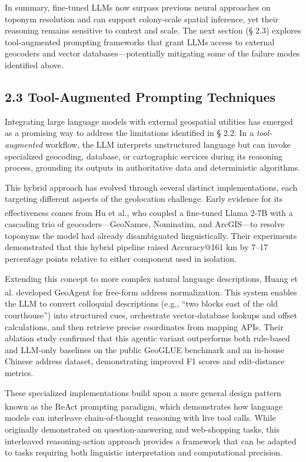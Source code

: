\documentclass[
  10pt,
  twocolumn]{article}
\begin{document}
In summary, fine-tuned LLMs now surpass previous neural approaches on
toponym resolution and can support colony-scale spatial inference, yet
their reasoning remains sensitive to context and scale. The next section
(§ 2.3) explores tool-augmented prompting frameworks that grant LLMs
access to external geocoders and vector databases---potentially
mitigating some of the failure modes identified above.

\subsection{2.3 Tool-Augmented Prompting
Techniques}\label{tool-augmented-prompting-techniques}

Integrating large language models with external geospatial utilities has
emerged as a promising way to address the limitations identified in §
2.2. In a \emph{tool-augmented} workflow, the LLM interprets
unstructured language but can invoke specialized geocoding, database, or
cartographic services during its reasoning process, grounding its
outputs in authoritative data and deterministic algorithms.

This hybrid approach has evolved through several distinct
implementations, each targeting different aspects of the geolocation
challenge. Early evidence for its effectiveness comes from Hu et
al.\textsuperscript{}, who coupled
a fine-tuned Llama 2-7B with a cascading trio of geocoders---GeoNames,
Nominatim, and ArcGIS---to resolve toponyms the model had already
disambiguated linguistically. Their experiments demonstrated that this
hybrid pipeline raised Accuracy@161 km by 7--17 percentage points
relative to either component used in isolation.

Extending this concept to more complex natural language descriptions,
Huang et al.\textsuperscript{}
developed GeoAgent for free-form address normalization. This system
enables the LLM to convert colloquial descriptions (e.g., ``two blocks
east of the old courthouse'') into structured cues, orchestrate
vector-database lookups and offset calculations, and then retrieve
precise coordinates from mapping APIs. Their ablation study confirmed
that this agentic variant outperforms both rule-based and LLM-only
baselines on the public GeoGLUE benchmark and an in-house Chinese
address dataset, demonstrating improved F1 scores and edit-distance
metrics.

These specialized implementations build upon a more general design
pattern known as the ReAct prompting
paradigm\textsuperscript{}, which
demonstrates how language models can interleave chain-of-thought
reasoning with live tool calls. While originally demonstrated on
question-answering and web-shopping tasks, this interleaved
reasoning-action approach provides a framework that can be adapted to
tasks requiring both linguistic interpretation and computational
precision.
\end{document}
